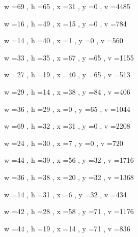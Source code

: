 \documentclass[11pt]{article}
\begin{document}
w =69 , h =65 , x =31 , y =0 , v =4485
\par
w =16 , h =49 , x =15 , y =0 , v =784
\par
w =14 , h =40 , x =1 , y =0 , v =560
\par
w =33 , h =35 , x =67 , y =65 , v =1155
\par
w =27 , h =19 , x =40 , y =65 , v =513
\par
w =29 , h =14 , x =38 , y =84 , v =406
\par
w =36 , h =29 , x =0 , y =65 , v =1044
\par
\newpage




w =69 , h =32 , x =31 , y =0 , v =2208
\par
w =24 , h =30 , x =7 , y =0 , v =720
\par
w =44 , h =39 , x =56 , y =32 , v =1716
\par
w =36 , h =38 , x =20 , y =32 , v =1368
\par
w =14 , h =31 , x =6 , y =32 , v =434
\par
w =42 , h =28 , x =58 , y =71 , v =1176
\par
w =44 , h =19 , x =14 , y =71 , v =836
\par
\newpage
\end{document}
